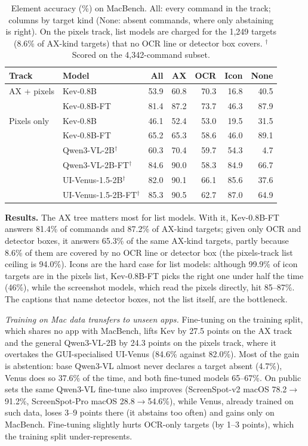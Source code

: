 \documentclass[sigconf,screen,review]{acmart}
\newcommand{\bench}{MacBench}
\begin{document}
\begin{table}[t]
\caption{Element accuracy (\%) on \bench{}. All: every command in the track; columns by target kind (None: absent commands, where only abstaining is right). On the pixels track, list models are charged for the 1,249 targets (8.6\% of AX-kind targets) that no OCR line or detector box covers. $^\dagger$Scored on the 4,342-command subset.}
\label{tab:results}
\small
\setlength{\tabcolsep}{4pt}
\begin{tabular}{@{}llrrrrr@{}}
\toprule
Track & Model & All & AX & OCR & Icon & None \\
\midrule
AX + pixels & Kev-0.8B & 53.9 & 60.8 & 70.3 & 16.8 & 40.5 \\
            & Kev-0.8B-FT & 81.4 & 87.2 & 73.7 & 46.3 & 87.9 \\
\midrule
Pixels only & Kev-0.8B & 46.1 & 52.4 & 53.0 & 19.5 & 31.5 \\
            & Kev-0.8B-FT & 65.2 & 65.3 & 58.6 & 46.0 & 89.1 \\
            & Qwen3-VL-2B$^\dagger$ & 60.3 & 70.4 & 59.7 & 54.3 & 4.7 \\
            & Qwen3-VL-2B-FT$^\dagger$ & 84.6 & 90.0 & 58.3 & 84.9 & 66.7 \\
            & UI-Venus-1.5-2B$^\dagger$ & 82.0 & 90.1 & 66.1 & 85.6 & 37.6 \\
            & UI-Venus-1.5-2B-FT$^\dagger$ & 85.3 & 90.5 & 62.7 & 87.0 & 64.9 \\
\bottomrule
\end{tabular}
\end{table}

\textbf{Results.} The AX tree matters most for list models. With it, Kev-0.8B-FT answers 81.4\% of commands and 87.2\% of AX-kind targets; given only OCR and detector boxes, it answers 65.3\% of the same AX-kind targets, partly because 8.6\% of them are covered by no OCR line or detector box (the pixels-track list ceiling is 94.0\%). Icons are the hard case for list models: although 99.9\% of icon targets are in the pixels list, Kev-0.8B-FT picks the right one under half the time (46\%), while the screenshot models, which read the pixels directly, hit 85--87\%. The captions that name detector boxes, not the list itself, are the bottleneck.

\emph{Training on Mac data transfers to unseen apps.} Fine-tuning on the training split, which shares no app with \bench{}, lifts Kev by 27.5 points on the AX track and the general Qwen3-VL-2B by 24.3 points on the pixels track, where it overtakes the GUI-specialised UI-Venus (84.6\% against 82.0\%). Most of the gain is abstention: base Qwen3-VL almost never declares a target absent (4.7\%), Venus does so 37.6\% of the time, and both fine-tuned models 65--67\%. On public sets the same Qwen3-VL fine-tune also improves (ScreenSpot-v2 macOS 78.2$\to$91.2\%, ScreenSpot-Pro macOS 28.8$\to$54.6\%), while Venus, already trained on such data, loses 3--9 points there (it abstains too often) and gains only on \bench{}. Fine-tuning slightly hurts OCR-only targets (by 1--3 points), which the training split under-represents.
\end{document}
